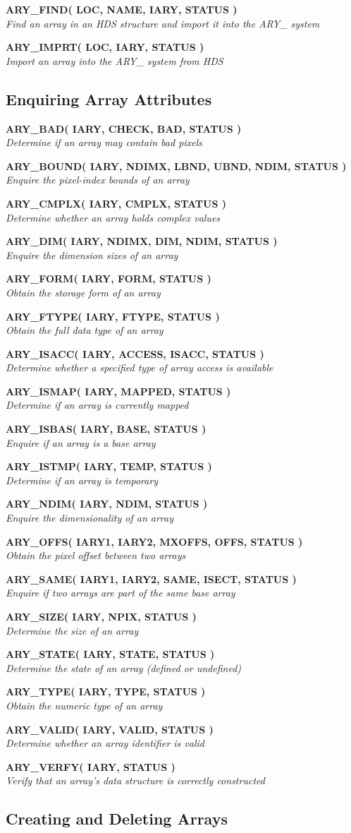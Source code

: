 \documentclass[twoside,11pt]{article}
\newcommand{\xlabel}[1]{}
\newcommand{\noteroutine}[2]{\textbf{#1}\hspace*{\fill}\nopagebreak \\
                             \hspace*{3em}\emph{#2}\hspace*{\fill}\par}
\begin{document}
\noteroutine{ARY\_FIND( LOC, NAME, IARY, STATUS )}
            {Find an array in an HDS structure and import it into the ARY\_ system}
\noteroutine{ARY\_IMPRT( LOC, IARY, STATUS )}
            {Import an array into the ARY\_ system from HDS}


\subsection{\xlabel{enquiring_array_attributes}Enquiring Array Attributes}
\label{enquiring_array_attributes}

\noteroutine{ARY\_BAD( IARY, CHECK, BAD, STATUS )}
            {Determine if an array may contain bad pixels}
\noteroutine{ARY\_BOUND( IARY, NDIMX, LBND, UBND, NDIM, STATUS )}
            {Enquire the pixel-index bounds of an array}
\noteroutine{ARY\_CMPLX( IARY, CMPLX, STATUS )}
            {Determine whether an array holds complex values}
\noteroutine{ARY\_DIM( IARY, NDIMX, DIM, NDIM, STATUS )}
            {Enquire the dimension sizes of an array}
\noteroutine{ARY\_FORM( IARY, FORM, STATUS )}
            {Obtain the storage form of an array}
\noteroutine{ARY\_FTYPE( IARY, FTYPE, STATUS )}
            {Obtain the full data type of an array}
\noteroutine{ARY\_ISACC( IARY, ACCESS, ISACC, STATUS )}
            {Determine whether a specified type of array access is available}
\noteroutine{ARY\_ISMAP( IARY, MAPPED, STATUS )}
            {Determine if an array is currently mapped}
\noteroutine{ARY\_ISBAS( IARY, BASE, STATUS )}
            {Enquire if an array is a base array}
\noteroutine{ARY\_ISTMP( IARY, TEMP, STATUS )}
            {Determine if an array is temporary}
\noteroutine{ARY\_NDIM( IARY, NDIM, STATUS )}
            {Enquire the dimensionality of an array}
\noteroutine{ARY\_OFFS( IARY1, IARY2, MXOFFS, OFFS, STATUS )}
            {Obtain the pixel offset between two arrays}
\noteroutine{ARY\_SAME( IARY1, IARY2, SAME, ISECT, STATUS )}
            {Enquire if two arrays are part of the same base array}
\noteroutine{ARY\_SIZE( IARY, NPIX, STATUS )}
            {Determine the size of an array}
\noteroutine{ARY\_STATE( IARY, STATE, STATUS )}
            {Determine the state of an array (defined or undefined)}
\noteroutine{ARY\_TYPE( IARY, TYPE, STATUS )}
            {Obtain the numeric type of an array}
\noteroutine{ARY\_VALID( IARY, VALID, STATUS )}
            {Determine whether an array identifier is valid}
\noteroutine{ARY\_VERFY( IARY, STATUS )}
            {Verify that an array's data structure is correctly constructed}

\subsection{\xlabel{creating_and_deleting_arrays}Creating and Deleting Arrays}
\label{creating_and_deleting_arrays}
\end{document}
